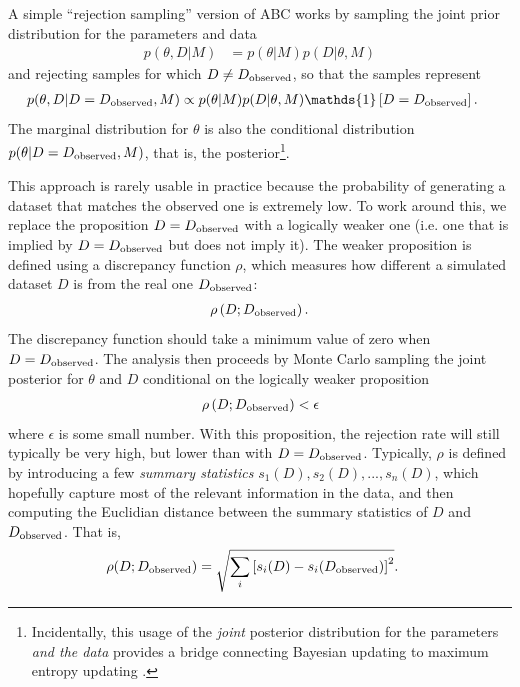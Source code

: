 \documentclass[article]{jss}
\begin{document}
A simple ``rejection sampling'' version of
ABC works by sampling the joint prior distribution for the parameters and
data
\begin{align}
p(\theta, D | M) &= p(\theta | M)p(D | \theta, M)
\end{align}
and rejecting samples for which $D \neq D_{\rm observed}$, so that the
samples represent
\begin{align}
p(\theta, D | D = D_{\rm observed}, M) &\propto p(\theta | M)p(D | \theta, M)
\mathds{1}\left[D = D_{\rm observed}\right].\label{eqn:abc_posterior}
\end{align}
The marginal distribution for $\theta$ is also the conditional distribution
$p(\theta | D = D_{\rm observed}, M)$, that is,
the posterior\footnote{Incidentally, this usage of the {\em joint} posterior
distribution for the parameters {\em and the data} provides a bridge
connecting Bayesian updating to maximum entropy updating \citep{caticha,giffin}.}.

This approach is rarely usable in practice because the probability of
generating a dataset that matches the observed one is extremely low.
To work around this, we replace the proposition
$D = D_{\rm observed}$ with a logically
weaker one (i.e. one that is implied by $D = D_{\rm observed}$ but does not
imply it).
The weaker proposition is defined using
a discrepancy function
$\rho$, which measures how different a simulated dataset $D$ is from
the real one $D_{\rm observed}$:
\begin{align}
\rho\left(D; D_{\rm observed}\right).
\end{align}
The discrepancy function should take a minimum value of zero when
$D = D_{\rm observed}$.
The analysis then proceeds by Monte Carlo sampling the
joint posterior for $\theta$ and $D$
conditional on the logically weaker proposition
\begin{align}
\rho\left(D; D_{\rm observed}\right) < \epsilon
\end{align}
where $\epsilon$ is some small number. With this proposition, the
rejection rate will still
typically be very high, but lower than with $D = D_{\rm observed}$.
Typically, $\rho$ is defined by introducing a few {\em summary statistics}
$s_1(D), s_2(D), ..., s_n(D)$, which hopefully capture most of the relevant
information in the data, and then computing the Euclidian distance
between the summary statistics of $D$ and $D_{\rm observed}$.
That is,
\begin{align}
\rho(D; D_{\rm observed}) &=
\sqrt{\sum_i \left[s_i(D) - s_i(D_{\rm observed})\right]^2}.
\end{align}
\end{document}
